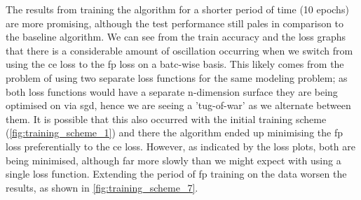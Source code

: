 The results from training the algorithm for a shorter period of time (10 epochs) are more promising, although the test performance still pales in comparison to the baseline algorithm. We can see from the train accuracy and the loss graphs that there is a considerable amount of oscillation occurring when we switch from using the \gls{ce} loss to the \gls{fp} loss on a batc-wise basis. This likely comes from the problem of using two separate loss functions for the same modeling problem; as both loss functions would have a separate n-dimension surface they are being optimised on via \gls{sgd}, hence we are seeing a 'tug-of-war' as we alternate between them. It is possible that this also occurred with the initial training scheme (\ref{fig:training_scheme_1}) and there the algorithm ended up minimising the \gls{fp} loss preferentially to the \gls{ce} loss. However, as indicated by the loss plots, both are being minimised, although far more slowly than we might expect with using a single loss function. Extending the period of \gls{fp} training on the data worsen the results, as shown in \ref{fig:training_scheme_7}.
\bigskip



